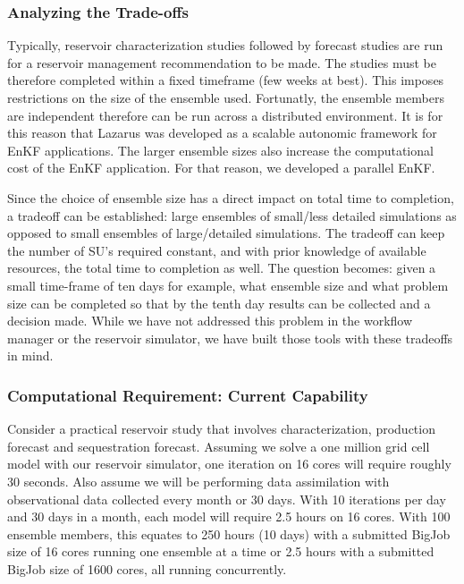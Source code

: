\documentclass{rspublic}
\begin{document}
\subsubsection{Analyzing the Trade-offs}  

Typically, reservoir characterization studies followed by forecast
studies are run for a reservoir management recommendation to be
made. The studies must be therefore completed within a fixed timeframe
(few weeks at best). This imposes restrictions on the size of the
ensemble used. Fortunatly, the ensemble members are independent
therefore can be run across a distributed environment. It is for this
reason that Lazarus was developed as a scalable autonomic framework
for EnKF applications. The larger ensemble sizes also increase the
computational cost of the EnKF application. For that reason, we
developed a parallel EnKF.

Since the choice of ensemble size has a direct impact on total time to
completion, a tradeoff can be established: large ensembles of
small/less detailed simulations as opposed to small ensembles of
large/detailed simulations. The tradeoff can keep the number of SU's
required constant, and with prior knowledge of available resources,
the total time to completion as well. The question becomes: given a
small time-frame of ten days for example, what ensemble size and what
problem size can be completed so that by the tenth day results can be
collected and a decision made. While we have not addressed this
problem in the workflow manager or the reservoir simulator, we have
built those tools with these tradeoffs in mind.

\subsubsection{Computational Requirement: Current Capability}


Consider a practical reservoir study that involves characterization,
production forecast and sequestration forecast. Assuming we solve a
one million grid cell model with our reservoir simulator, one
iteration on 16 cores will require roughly 30 seconds. Also assume we
will be performing data assimilation with observational data collected
every month or 30 days. With 10 iterations per day and 30 days in a
month, each model will require 2.5 hours on 16 cores. With 100
ensemble members, this equates to 250 hours (10 days) with a submitted
BigJob size of 16 cores running one ensemble at a time or 2.5 hours
with a submitted BigJob size of 1600 cores, all running concurrently.
\end{document}
